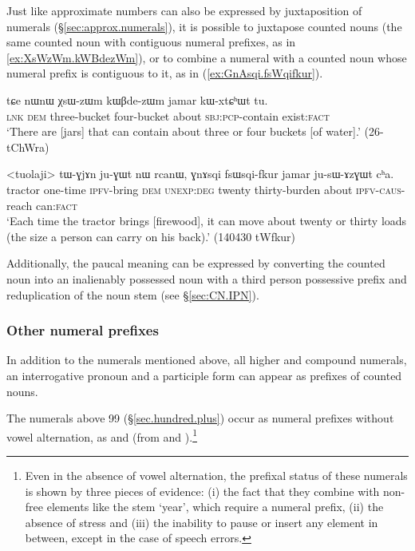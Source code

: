 Just like approximate numbers can also be expressed by juxtaposition of numerals  (§\ref{sec:approx.numerals}), it is possible to juxtapose counted nouns (the same counted noun with contiguous numeral prefixes, as in \ref{ex:XsWzWm.kWBdezWm}), or to combine a numeral with a counted noun whose numeral prefix is contiguous to it, as in (\ref{ex:GnAsqi.fsWqifkur}).

\begin{exe}
\ex \label{ex:XsWzWm.kWBdezWm}
\gll tɕe nɯnɯ χsɯ-zɯm kɯβde-zɯm jamar kɯ-xtɕʰɯt tu. \\
 \textsc{lnk} \textsc{dem} three-bucket four-bucket about \textsc{sbj}:\textsc{pcp}-contain exist:\textsc{fact} \\
\glt `There are [jars] that can contain about three or four buckets [of water].' (26-tChWra)
\end{exe}

\begin{exe}
\ex \label{ex:GnAsqi.fsWqifkur}
\gll <tuolaji> tɯ-ɣjɤn ju-ɣɯt nɯ rcanɯ, ɣnɤsqi fsɯsqi-fkur jamar ju-sɯ-ɤzɣɯt cʰa.  \\
 tractor one-time \textsc{ipfv}-bring \textsc{dem} \textsc{unexp}:\textsc{deg} twenty thirty-burden about \textsc{ipfv}-\textsc{caus}-reach can:\textsc{fact} \\
\glt `Each time the tractor brings [firewood], it can move about twenty or thirty loads (the size a person can carry on his back).' (140430 tWfkur)
\end{exe}

Additionally, the paucal meaning can be expressed by converting the counted noun into an inalienably possessed noun with a third person possessive prefix and reduplication of the noun stem (see §\ref{sec:CN.IPN}).

\subsubsection{Other numeral prefixes} \label{sec:other.numeral.prefixes}
In addition to the numerals mentioned above, all higher and compound numerals, an interrogative pronoun and a participle form can appear as prefixes of counted nouns.

The numerals above 99 (§\ref{sec.hundred.plus}) occur as numeral prefixes without vowel alternation, as  and  (from  and ).\footnote{Even in the absence of vowel alternation, the prefixal status of these numerals is shown by three pieces of evidence: (i) the fact that they combine with non-free elements like the stem  `year', which require a numeral prefix, (ii) the absence of stress and (iii) the inability to pause or insert any element in between, except in the case of speech errors. } 

